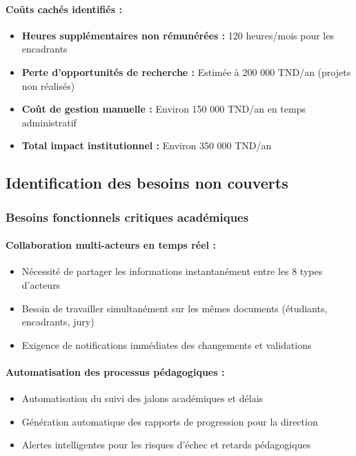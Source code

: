 \paragraph{Coûts cachés identifiés :}
\begin{itemize}
    \item \textbf{Heures supplémentaires non rémunérées :} 120 heures/mois pour les encadrants
    \item \textbf{Perte d'opportunités de recherche :} Estimée à 200 000 TND/an (projets non réalisés)
    \item \textbf{Coût de gestion manuelle :} Environ 150 000 TND/an en temps administratif
    \item \textbf{Total impact institutionnel :} Environ 350 000 TND/an
\end{itemize}

\subsection{Identification des besoins non couverts}

\subsubsection{Besoins fonctionnels critiques académiques}

\paragraph{Collaboration multi-acteurs en temps réel :}
\begin{itemize}
    \item Nécessité de partager les informations instantanément entre les 8 types d'acteurs
    \item Besoin de travailler simultanément sur les mêmes documents (étudiants, encadrants, jury)
    \item Exigence de notifications immédiates des changements et validations
\end{itemize}

\paragraph{Automatisation des processus pédagogiques :}
\begin{itemize}
    \item Automatisation du suivi des jalons académiques et délais
    \item Génération automatique des rapports de progression pour la direction
    \item Alertes intelligentes pour les risques d'échec et retards pédagogiques
\end{itemize}

